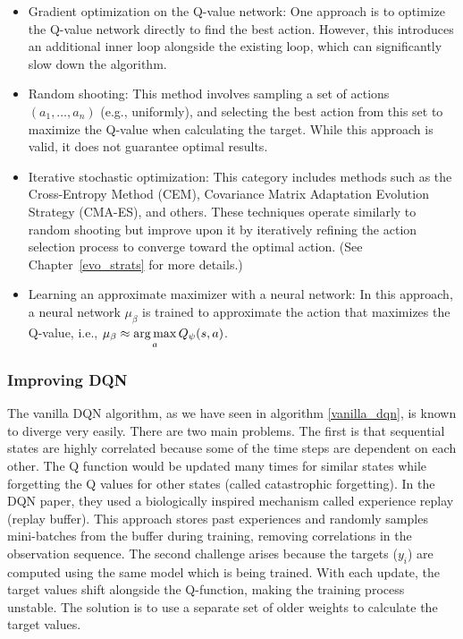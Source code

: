   \begin{itemize}
    \item Gradient optimization on the Q-value network: One approach is to optimize the Q-value 
      network directly to find the best action. However, this introduces an additional inner loop 
      alongside the existing loop, which can significantly slow down the algorithm.

    \item Random shooting: This method involves sampling a set of actions $( a_1, \dots, a_n )$ 
      (e.g., uniformly), and selecting the best action from this set to maximize the Q-value when 
      calculating the target. While this approach is valid, it does not guarantee optimal results.

    \item Iterative stochastic optimization: This category includes methods such as the Cross-Entropy Method (CEM),
      Covariance Matrix Adaptation Evolution Strategy (CMA-ES), and others. These techniques operate similarly to random
      shooting but improve upon it by iteratively refining the action selection process to converge toward the optimal action. 
      (See Chapter~\ref{evo_strats} for more details.)

    \item Learning an approximate maximizer with a neural network: In this approach, a neural 
      network $ \mu_\beta $ is trained to approximate the action that maximizes the Q-value, i.e., 
      $ \mu_\beta \approx \operatorname*{arg\,max}\limits_a Q_\psi(s,a) $.
  \end{itemize}

  \subsubsection{Improving DQN}
  The vanilla DQN algorithm, as we have seen in algorithm \ref{vanilla_dqn}, is known to diverge 
  very easily. There are two main problems. The first is that sequential states are 
  highly correlated because some of the time steps are dependent on each other. The Q function would be 
  updated many times for similar states while forgetting the Q values for other states 
  (called catastrophic forgetting). In the DQN paper, they used a biologically 
  inspired mechanism called experience replay (replay buffer). This approach stores past experiences and 
  randomly samples mini-batches from the buffer during training, removing correlations in the observation sequence.\newline
  The second challenge arises because the targets ($y_i$) are computed using the same model which is being trained. 
  With each update, the target values shift alongside the Q-function, making the training process unstable. The solution is
  to use a separate set of older weights to calculate the target values.

